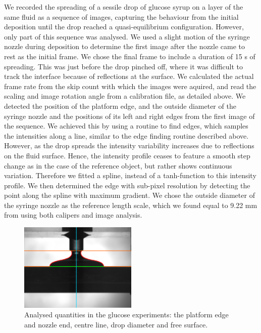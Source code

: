 \documentclass[aip,graphicx]{revtex4-1}
\begin{document}
We recorded the spreading of a sessile drop of glucose syrup on a layer of the same fluid as a sequence of images, capturing the behaviour from the initial deposition until the drop reached a quasi-equilibrium configuration. 
However, only part of this sequence was analysed. 
We used a slight motion of the syringe nozzle during deposition to determine the first image after the nozzle came to rest as the initial frame.
We chose the final frame to include a duration of 15 s of spreading. 
This was just before the drop pinched off, where it was difficult to track the interface because of reflections at the surface.
We calculated the actual frame rate from the skip count with which the images were aquired, and read the scaling and image rotation angle from a calibration file, as detailed above. 
We detected the position of the platform edge, and the outside diameter of the syringe nozzle and the positions of its left and right edges from the first image of the sequence. 
We achieved this by using a routine to find edges, which samples the intensities along a line, similar to the edge finding routine described above.
However, as the drop spreads the intensity variability increases due to reflections on the fluid surface. 
Hence, the intensity profile ceases to feature a smooth step change as in the case of the reference object, but rather shows continuous variation. 
Therefore we fitted a spline, instead of a tanh-function to this intensity profile.
We then determined the edge with sub-pixel resolution by detecting the point along the spline with maximum gradient. 
We chose the outside diameter of the syringe nozzle as the reference length scale, which we found equal to 9.22 mm from using both calipers and image analysis. 

\begin{figure}[!ht]
\centering
\includegraphics[trim={10px 150px 10px 75px},clip,width=0.5\textwidth]{figures/111014_glucose_syrup_thick_layer_8_0117_analysed.eps}
\caption{Analysed quantities in the glucose experiments: the platform edge and nozzle end, centre line, drop diameter and free surface.}
\label{fig:analysis_glucose}
\end{figure}
\end{document}

